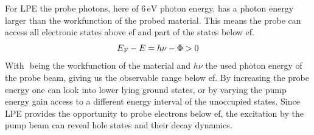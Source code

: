 \documentclass[a4paper,12pt,twoside]{article}
\begin{document}
For LPE the probe photons, here of $6\,\mathrm{\mbox{eV}}$ photon energy, has a photon energy larger than the workfunction of the probed material. This means the probe can access all electronic states above \gls{ef} and part of the states below \gls{ef}.%
	\begin{equation}
	        \label{energybelowef}
	    E\textsubscript{$\mathrm{F}$} - E = h\nu -\Phi > 0
	\end{equation}
With \textTheta \,\,being the workfunction of the material and $h\nu$ the used photon energy of the probe beam, giving us the observable range below \gls{ef}. By increasing the probe energy one can look into lower lying ground states, or by varying the pump energy gain access to a different energy interval of the unoccupied states. Since \gls{LPE} provides the opportunity to probe electrons below \gls{ef}, the excitation by the pump beam can reveal hole states and their decay dynamics. 
        	
        	
\end{document}
